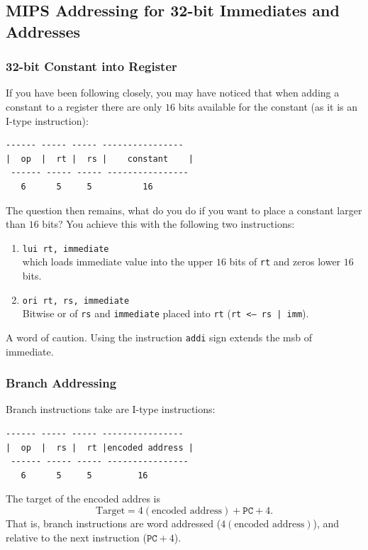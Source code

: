 \documentclass[10pt]{article}
\begin{document}
\subsection{MIPS Addressing for 32-bit Immediates and Addresses}\label{subsec:}
\subsubsection{32-bit Constant into Register}
If you have been following closely, you may have noticed that when adding a constant to a register there are only $16$ bits available for the constant (as it is an I-type instruction):
\begin{lstlisting}[style=CStyle, numbers=none, xleftmargin=5.0ex, aboveskip=1em, belowskip=1em, numberstyle=\color{blue}, escapeinside=..]
 ------ ----- ----- ----------------
|  op  |  rt |  rs |    constant    |
 ------ ----- ----- ----------------
   6      5     5          16
\end{lstlisting}
The question then remains, what do you do if you want to place a constant larger than $16$ bits?  You achieve this with the following two instructions:
\begin{enumerate}
\item \texttt{lui rt, immediate}\\
  which loads immediate value into the upper $16$ bits of \texttt{rt} and zeros lower $16$ bits.
\item \texttt{ori rt, rs, immediate}\\
  Bitwise or of \texttt{rs} and \texttt{immediate} placed into \texttt{rt} (\texttt{rt <-- rs | imm}).  
\end{enumerate}
\begin{marginfigure}
A word of caution.  Using the instruction \texttt{addi} sign extends the msb of immediate. 
\end{marginfigure}%
\subsubsection{Branch Addressing}
Branch instructions take are I-type instructions:
\begin{lstlisting}[style=CStyle, numbers=none, xleftmargin=5.0ex, aboveskip=1em, belowskip=1em, numberstyle=\color{blue}, escapeinside=..]
 ------ ----- ----- ----------------
|  op  |  rs |  rt |encoded address |
 ------ ----- ----- ----------------
   6      5     5         16
\end{lstlisting}
The target of the encoded addres is
\[\text{Target} = 4(\text{encoded address}) + \texttt{PC} + 4.\]
That is, branch instructions are word addressed ($4(\text{encoded address})$), and relative to the next instruction ($\texttt{PC} + 4$).
\end{document}
